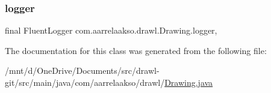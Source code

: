 \subsubsection{\texorpdfstring{logger}{logger}}
{\footnotesize\ttfamily final Fluent\+Logger com.\+aarrelaakso.\+drawl.\+Drawing.\+logger\hspace{0.3cm}{\ttfamily [static]}, {\ttfamily [private]}}



The documentation for this class was generated from the following file\+:\begin{DoxyCompactItemize}
\item 
/mnt/d/\+One\+Drive/\+Documents/src/drawl-\/git/src/main/java/com/aarrelaakso/drawl/\hyperlink{_drawing_8java}{Drawing.\+java}\end{DoxyCompactItemize}
